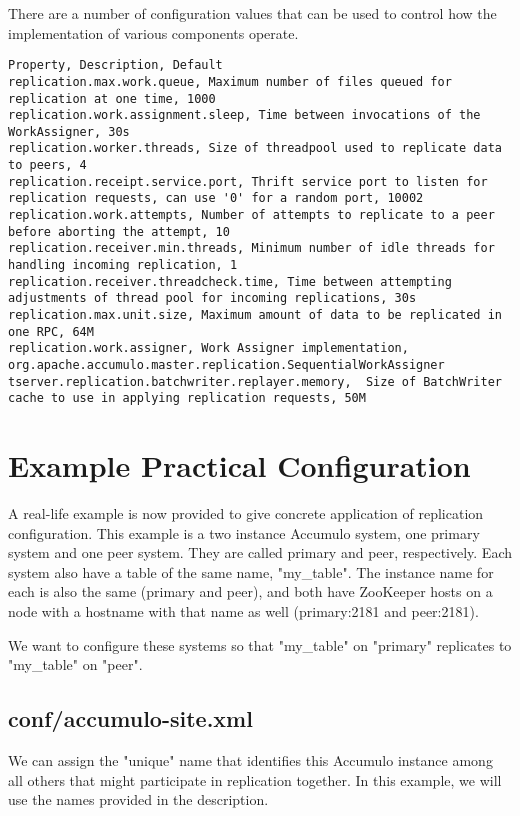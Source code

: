 There are a number of configuration values that can be used to control how
the implementation of various components operate.

\begingroup\fontsize{8pt}{8pt}\selectfont\begin{verbatim}
Property, Description, Default
replication.max.work.queue, Maximum number of files queued for replication at one time, 1000
replication.work.assignment.sleep, Time between invocations of the WorkAssigner, 30s
replication.worker.threads, Size of threadpool used to replicate data to peers, 4
replication.receipt.service.port, Thrift service port to listen for replication requests, can use '0' for a random port, 10002
replication.work.attempts, Number of attempts to replicate to a peer before aborting the attempt, 10
replication.receiver.min.threads, Minimum number of idle threads for handling incoming replication, 1
replication.receiver.threadcheck.time, Time between attempting adjustments of thread pool for incoming replications, 30s
replication.max.unit.size, Maximum amount of data to be replicated in one RPC, 64M
replication.work.assigner, Work Assigner implementation, org.apache.accumulo.master.replication.SequentialWorkAssigner
tserver.replication.batchwriter.replayer.memory,  Size of BatchWriter cache to use in applying replication requests, 50M
\end{verbatim}\endgroup

\section{Example Practical Configuration}

A real-life example is now provided to give concrete application of replication configuration. This
example is a two instance Accumulo system, one primary system and one peer system. They are called
primary and peer, respectively. Each system also have a table of the same name, "my_table". The instance
name for each is also the same (primary and peer), and both have ZooKeeper hosts on a node with a hostname
with that name as well (primary:2181 and peer:2181).

We want to configure these systems so that "my_table" on "primary" replicates to "my_table" on "peer".

\subsection{conf/accumulo-site.xml}

We can assign the "unique" name that identifies this Accumulo instance among all others that might participate
in replication together. In this example, we will use the names provided in the description.

